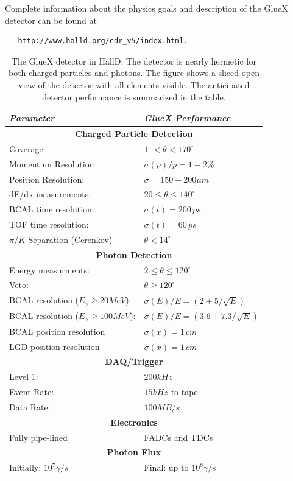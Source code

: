 \bigskip
Complete information about the physics goals and description of the GlueX detector
can be found at
\begin{verbatim} 
   http://www.halld.org/cdr_v5/index.html.
\end{verbatim}


\begin{table}[t]
\begin{center}
\begin{tabular}{ll}
\hline\hline
{\centering \textbf{\textit{Parameter}}} & 
{\centering \textbf{\textit{GlueX Performance}}} \\
\hline
\multicolumn{2}{c}{\textbf{Charged Particle Detection}} \\
Coverage              & $1^{\circ} < \theta < 170^{\circ}$  \\
Momentum Resolution   & $\sigma(p)/p=1-2\%$ \\    
Position Resolution:  & $\sigma=150-200\mu m$ \\
dE/dx measurements:   & $20\le \theta \le 140^{\circ}$ \\
BCAL time resolution: & $\sigma(t)=200\, ps$ \\
TOF time resolution:  & $\sigma(t)=60\, ps$ \\
$\pi/K$ Separation (Cerenkov) & $\theta < 14^{\circ}$ \\
\multicolumn{2}{c}{\textbf{Photon Detection}} \\
Energy measurments:   & $2\le \theta \le 120^{\circ}$ \\
Veto:                 & $\theta \geq 120^{\circ}$ \\
BCAL resolution ($E_{\gamma}\geq 20 MeV$):  & $\sigma(E)/E=(2+5/\sqrt{E})$ \\
BCAL resolution ($E_{\gamma}\geq 100 MeV$): & $\sigma(E)/E=(3.6+7.3/\sqrt{E})$ \\
BCAL  position resolution & $\sigma(x)=1\, cm$ \\
LGD  position resolution & $\sigma(x)=1\, cm$ \\
\multicolumn{2}{c}{\textbf{DAQ/Trigger}} \\
Level 1:     & $200 kHz$ \\
Event Rate: & $15 kHz$ to tape \\
Data Rate:   & $100 MB/s$ \\
\multicolumn{2}{c}{\textbf{Electronics}} \\
Fully pipe-lined &  FADCs and TDCs \\
\multicolumn{2}{c}{\textbf{Photon Flux}} \\
Initially: $10^{7} \gamma/s$ & Final: up to $10^{8}\gamma/s$ \\
\hline\hline
\end{tabular}
\caption[]{\label{tab:gluex_det}The GlueX detector in HallD. The detector is
nearly hermetic for both charged particles and photons. The figure shows 
a sliced open view of the detector with all elements visible. The anticipated 
detector performance is summarized in the table.}
\end{center}
\end{table}



